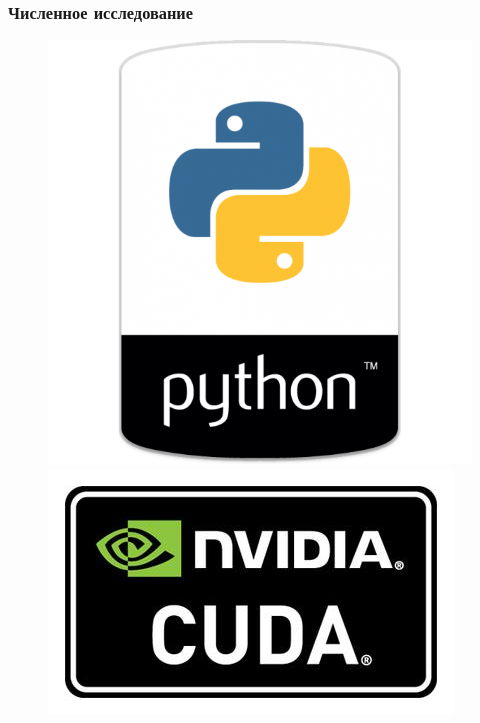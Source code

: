 \documentclass[fullscreen=true, unicode, bookmarks=false]{beamer}
\begin{document}
\begin{frame}
\frametitle{ Численное исследование } 

\begin{figure} 
\includegraphics[scale=0.25]{python.png}  
\hfill
\includegraphics[scale=0.45]{cuda.jpg} 
\end{figure}

\end{frame}
\end{document}
